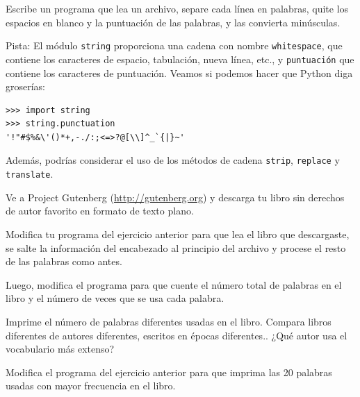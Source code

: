\documentclass[10pt]{book}
\begin{document}
\begin{exercise}

Escribe un programa que lea un archivo, separe cada línea en
palabras, quite los espacios en blanco y la puntuación de las palabras,
y las convierta minúsculas.

Pista: El módulo {\tt string} proporciona una cadena con nombre {\tt whitespace},
que contiene los caracteres de espacio, tabulación, nueva línea, etc.,
y {\tt puntuación} que contiene los caracteres de puntuación.  Veamos
si podemos hacer que Python diga groserías:

\begin{verbatim}
>>> import string
>>> string.punctuation
'!"#$%&\'()*+,-./:;<=>?@[\\]^_`{|}~'
\end{verbatim}
%
Además, podrías considerar el uso de los métodos de cadena {\tt strip},
{\tt replace} y {\tt translate}.

\end{exercise}


\begin{exercise}

Ve a Project Gutenberg (\url{http://gutenberg.org}) y descarga
tu libro sin derechos de autor favorito en formato de texto plano.

Modifica tu programa del ejercicio anterior para que lea el libro
que descargaste, se salte la información del encabezado al principio
del archivo y procese el resto de las palabras como antes.

Luego, modifica el programa para que cuente el número total de palabras en
el libro y el número de veces que se usa cada palabra.

Imprime el número de palabras diferentes usadas en el libro.  Compara
libros diferentes de autores diferentes, escritos en épocas diferentes..
¿Qué autor usa el vocabulario más extenso?
\end{exercise}


\begin{exercise}

Modifica el programa del ejercicio anterior para que imprima las
20 palabras usadas con mayor frecuencia en el libro.

\end{exercise}
\end{document}
